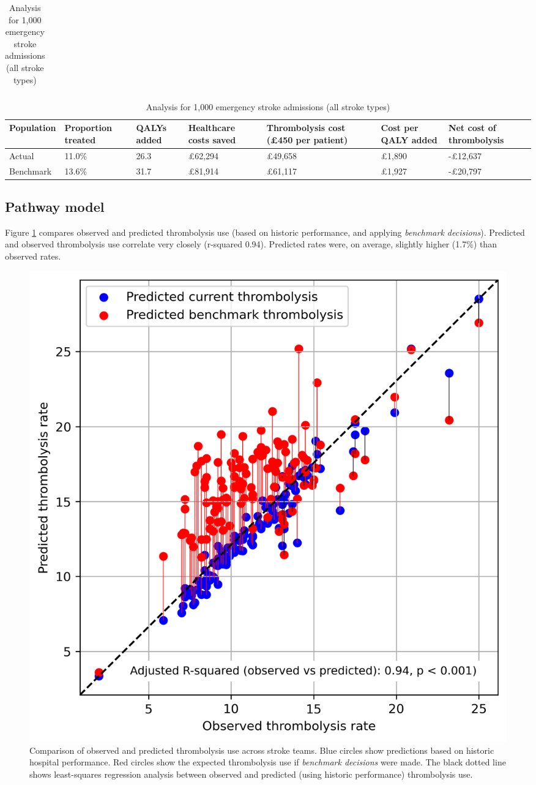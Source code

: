 \begin{table}[!h]
\begin{subtable}{1\textwidth}
\begin{tabular}{p{2.0cm} p{1.5cm} p{1.2cm} p{1.3cm} p{1.5cm} p{1.3cm} p{1.4cm} p{1.3cm} p{1.3cm}}
\end{tabular}
\end{subtable}

\vspace{3mm}

\begin{subtable}{1\textwidth}
\centering
\caption{Analysis for 1,000 emergency stroke admissions (all stroke types)}
\begin{tabular}{p{1.9cm} p{1.9cm} p{1.9cm} p{1.9cm} p{1.9cm} p{1.9cm} p{2.2cm}}
\toprule
Population & Proportion treated & QALYs added & Healthcare costs saved & \raggedright Thrombolysis cost (£450 per patient) & \raggedright Cost per QALY added & \raggedright Net cost of thrombolysis\tabularnewline
\midrule
Actual & 11.0\% & 26.3 & £62,294 & £49,658 & £1,890 & -£12,637\tabularnewline
Benchmark & 13.6\% & 31.7 & £81,914 & £61,117 & £1,927 & -£20,797\tabularnewline
\bottomrule
\end{tabular}
\end{subtable}
\label{tab:health_econ}
\end{table}

\normalsize

\subsection{Pathway model}

Figure \ref{fig:thrombolysis_rates_teams} compares observed and predicted thrombolysis use (based on historic performance, and applying \textit{benchmark decisions}). Predicted and observed thrombolysis use correlate very closely (r-squared 0.94). Predicted rates were, on average, slightly higher (1.7\%) than observed rates.

\begin{figure}[!h]
    \centering
    \includegraphics[width=0.5\linewidth]{images/thrombolysis_rates_model}
    \caption{Comparison of observed and predicted thrombolysis use across stroke teams. Blue circles show predictions based on historic hospital performance. Red circles show the expected thrombolysis use if \textit{benchmark decisions} were made. The black dotted line shows least-squares regression analysis between observed and predicted (using historic performance) thrombolysis use.}
    \label{fig:thrombolysis_rates_teams}
\end{figure}


